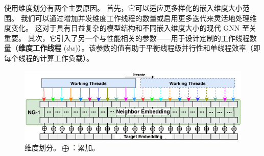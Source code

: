 使用维度划分有两个主要原因。
首先，它可以适应更多样化的嵌入维度大小范围。
我们可以通过增加并发维度工作线程的数量或启用更多迭代来灵活地处理维度变化。
这对于具有日益复杂的模型结构和不同嵌入维度大小的现代 GNN 至关重要。
其次，它引入了另一个与性能相关的参数——用于设计定制的工作线程数量（\textbf{维度工作线程} ($dw$)）。该参数的值有助于平衡线程级并行性和单线程效率（即每个线程的计算工作负载）。
\begin{figure} [t] \small
    \centering
    \includegraphics[width=\columnwidth]{images/dimension-sharing.pdf}
    \caption{维度划分。$\bigoplus$：累加。}
    \vspace{-15pt}
    \label{fig: Dimension-based Workload Sharing.}
\end{figure}


